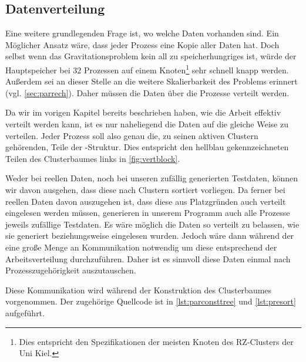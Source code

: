     \clearpage
  
  \subsection{Datenverteilung}
  \label{sec:data}
    
    Eine weitere grundlegenden Frage ist, wo welche Daten vorhanden sind. Ein Möglicher Ansatz wäre, dass jeder Prozess eine Kopie aller Daten hat. Doch selbst wenn das Gravitationsproblem kein all
    zu speicherhungriges ist, würde der Hauptspeicher bei 32 Prozessen auf einem Knoten\footnote{Dies entspricht den Spezifikationen der meisten Knoten des RZ-Clusters der Uni Kiel.}  sehr schnell 
    knapp werden. Außerdem sei an dieser Stelle an die weitere Skalierbarkeit des Problems erinnert (vgl. \autoref{sec:parrech}). Daher müssen die Daten über die Prozesse verteilt werden. 
    
    Da wir im vorigen Kapitel bereits beschrieben haben, wie die Arbeit effektiv verteilt werden kann, ist es nur naheliegend die Daten auf die gleiche Weise zu verteilen. Jeder Prozess soll also 
    genau die, zu seinen aktiven Clustern gehörenden, Teile der -Struktur. Dies entspricht den hellblau gekennzeichneten Teilen des Clusterbaumes links in \autoref{fig:vertblock}.
    
    Weder bei reellen Daten, noch bei unseren zufällig generierten Testdaten, können wir davon ausgehen, dass diese nach Clustern sortiert vorliegen. Da ferner bei reellen Daten davon auszugehen
    ist, dass diese aus Platzgründen auch verteilt eingelesen werden müssen, generieren in unserem Programm auch alle Prozesse jeweils zufällige Testdaten. Es wäre möglich die Daten so verteilt
    zu belassen, wie sie generiert beziehungsweise eingelesen wurden. Jedoch wäre dann während der \vorruck eine große Menge an Kommunikation notwendig um diese entsprechend der Arbeitsverteilung
    durchzuführen. Daher ist es sinnvoll diese Daten einmal nach Prozesszugehörigkeit auszutauschen.
    
    Diese Kommunikation wird während der Konstruktion des Clusterbaumes vorgenommen. Der zugehörige Quellcode ist in \autoref{lst:parconsttree} und \autoref{lst:presort} aufgeführt. 